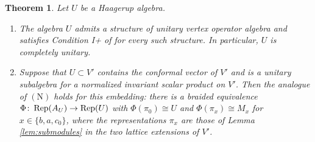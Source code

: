 \documentclass[leqno]{article}
\let\cal\relax
\newcommand{\cal}{\mathcal}
\newcommand{\co}{\colon}
\DeclareMathOperator{\Rep}{Rep} %
\newtheorem{thm}{Theorem}[section]
\numberwithin{equation}{section}
\begin{document}
\begin{thm}
\label{rem:all-haagerup}
Let $U$ be a Haagerup algebra.
\begin{enumerate}
\item The algebra $U$ admits a structure of unitary vertex operator algebra and satisfies Condition I+ of \cite[Definition 6.17 p.~70]{Gui25} for every such structure. In particular, $U$ is completely unitary.
\item Suppose that $U \subset V'$ contains the conformal vector of $V'$ and is a unitary subalgebra for a normalized invariant scalar product on $V'$. Then the analogue of $\mathrm{(N)}$ holds for this embedding: there is a braided equivalence $\Phi \co \Rep(\cal A_U) \to \Rep(U)$ with $\Phi(\pi_0) \cong U$ and $\Phi(\pi_x) \cong M_x$ for $x \in \{b,a,c_0\}$, where the representations $\pi_x$ are those of Lemma \ref{lem:submodules} in the two lattice extensions of $V'$.
\end{enumerate}
\end{thm}
\end{document}
